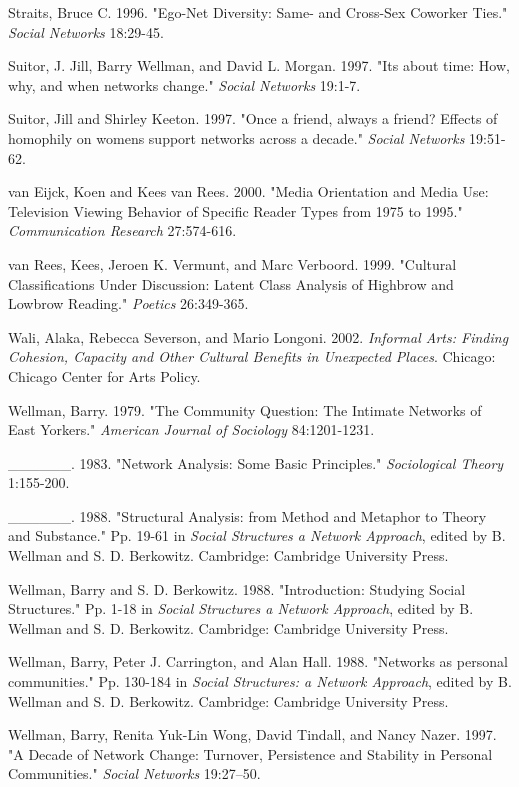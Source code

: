 \documentclass[
]{article}
\begin{document}
Straits, Bruce C. 1996. "Ego-Net Diversity: Same- and Cross-Sex Coworker Ties." \emph{Social Networks} 18:29-45.

Suitor, J. Jill, Barry Wellman, and David L. Morgan. 1997. "It\textquotesingle s about time: How, why, and when networks change." \emph{Social Networks} 19:1-7.

Suitor, Jill and Shirley Keeton. 1997. "Once a friend, always a friend? Effects of homophily on women\textquotesingle s support networks across a decade." \emph{Social Networks} 19:51-62.

van Eijck, Koen and Kees van Rees. 2000. "Media Orientation and Media Use: Television Viewing Behavior of Specific Reader Types from 1975 to 1995." \emph{Communication Research} 27:574-616.

van Rees, Kees, Jeroen K. Vermunt, and Marc Verboord. 1999. "Cultural Classifications Under Discussion: Latent Class Analysis of Highbrow and Lowbrow Reading." \emph{Poetics} 26:349-365.

Wali, Alaka, Rebecca Severson, and Mario Longoni. 2002. \emph{Informal Arts: Finding Cohesion, Capacity and Other Cultural Benefits in Unexpected Places}. Chicago: Chicago Center for Arts Policy.

Wellman, Barry. 1979. "The Community Question: The Intimate Networks of East Yorkers." \emph{American Journal of Sociology} 84:1201-1231.

\_\_\_\_\_\_. 1983. "Network Analysis: Some Basic Principles." \emph{Sociological Theory} 1:155-200.

\_\_\_\_\_\_. 1988. "Structural Analysis: from Method and Metaphor to Theory and Substance." Pp. 19-61 in \emph{Social Structures a Network Approach}, edited by B. Wellman and S. D. Berkowitz. Cambridge: Cambridge University Press.

Wellman, Barry and S. D. Berkowitz. 1988. "Introduction: Studying Social Structures." Pp. 1-18 in \emph{Social Structures a Network Approach}, edited by B. Wellman and S. D. Berkowitz. Cambridge: Cambridge University Press.

Wellman, Barry, Peter J. Carrington, and Alan Hall. 1988. "Networks as personal communities." Pp. 130-184 in \emph{Social Structures: a Network Approach}, edited by B. Wellman and S. D. Berkowitz. Cambridge: Cambridge University Press.

Wellman, Barry, Renita Yuk-Lin Wong, David Tindall, and Nancy Nazer. 1997. "A Decade of Network Change: Turnover, Persistence and Stability in Personal Communities." \emph{Social Networks} 19:27--50.
\end{document}
